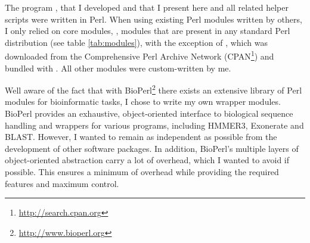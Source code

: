 The program \pname, that I developed and that I present here and all related
helper scripts were written in Perl. When using existing Perl modules written
by others, I only relied on core modules, \ie, modules that are present in any
standard Perl distribution (see table \ref{tab:modules}), with the exception of
 \citep{shan2001}, which was downloaded from the Comprehensive
Perl Archive Network (CPAN\footnote{\url{http://search.cpan.org}}) and bundled
with \pname. All other modules were custom-written by me.



Well aware of the fact that with BioPerl\footnote{\url{http://www.bioperl.org}}
there exists an extensive library of Perl modules for bioinformatic tasks, I
chose to write my own wrapper modules. BioPerl provides an exhaustive,
object-oriented interface to biological sequence handling and wrappers for
various programs, including HMMER3, Exonerate and BLAST. However, I wanted
\pname to remain as independent as possible from the development of other
software packages. In addition, BioPerl's multiple layers of object-oriented
abstraction carry a lot of overhead, which I wanted to avoid if possible. This
ensures a minimum of overhead while providing the required features and maximum
control.
